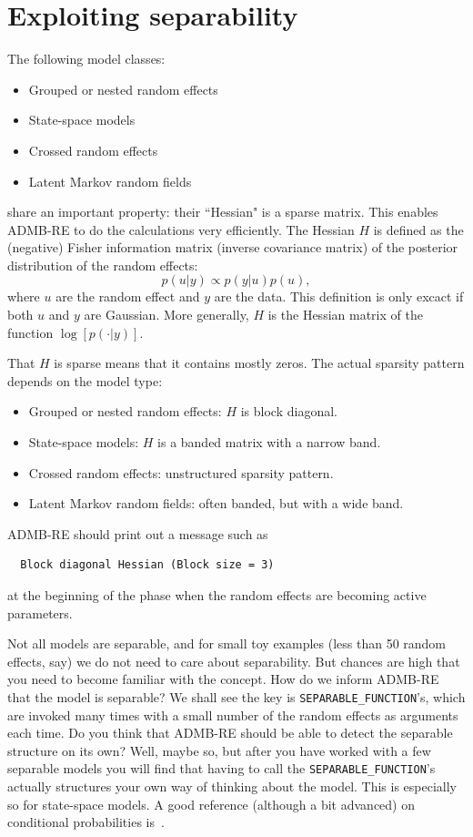 \documentclass[12pt,letter,reqno]{book}
\begin{document}
\chapter{Exploiting separability}
\label{separability}
The following model classes:
\begin{itemize}
  \item Grouped or nested random effects
  \item State-space models
  \item Crossed random effects
   \item Latent Markov random fields
\end{itemize}
share an important property: their ``Hessian" is a sparse matrix. This enables
ADMB-RE to do the calculations very efficiently. The Hessian $H$ is defined
as the (negative) Fisher information matrix (inverse covariance matrix) of the posterior distribution of the random effects:
\begin{equation}
  p(u|y) \propto p(y|u)p(u),
  \label{p(u|y)}
\end{equation}
where $u$ are the random effect and $y$ are the data. This definition is only excact if both $u$ and $y$ are
Gaussian. More generally, $H$ is the Hessian matrix of the function $\log[p(\cdot|y)]$.

That $H$ is sparse means that it contains mostly zeros. The actual sparsity pattern depends on the model type:
\begin{itemize}
  \item Grouped or nested random effects: $H$ is block diagonal.
  \item State-space models: $H$ is a banded matrix with a narrow band.
  \item Crossed random effects: unstructured sparsity pattern.
   \item Latent Markov random fields: often banded, but with a wide band.
\end{itemize}
ADMB-RE should print out a message such as
\begin{lstlisting}
  Block diagonal Hessian (Block size = 3)
\end{lstlisting}
at the beginning of the phase when the random effects are becoming active parameters. 

Not all models are separable, and for small toy examples (less than 50 random effects, say)
we do not need to care about separability. But chances are high that you need to become
familiar with the concept. How do we inform ADMB-RE that the model is separable?
We shall see the key is \texttt{SEPARABLE\_FUNCTION}'s,  which are invoked
many times with a small number of the random effects as arguments each time.
Do you think that ADMB-RE should be able to detect the separable structure
on its own? Well, maybe so, but after you have worked with a few separable
models you will find that having to call the \texttt{SEPARABLE\_FUNCTION}'s
actually structures your own way of thinking about the model. This is especially
so for state-space models. A good reference (although a bit advanced) on conditional probabilities is~.
\end{document}
